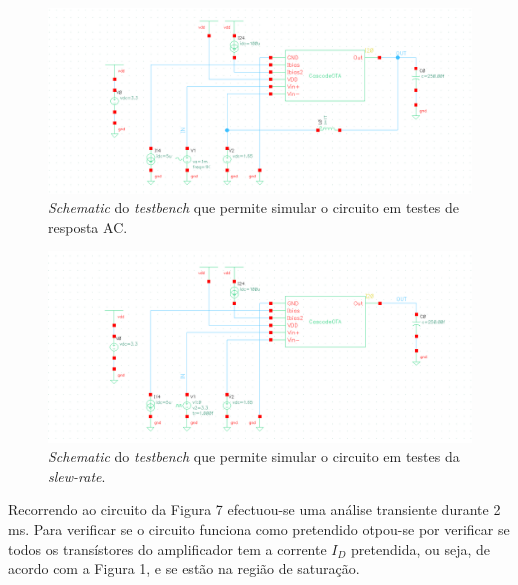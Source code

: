 \documentclass[11pt]{article}
\numberwithin{equation}{section}
\begin{document}
\begin{figure}[H]
	\centering
	\includegraphics[keepaspectratio=true, scale=0.25]{exps/TBac}
	\vspace{-0.5em}
	\caption{\textit{Schematic} do \textit{testbench} que permite simular o circuito em testes de resposta AC.}
	\vspace{-0.8em}
\end{figure} 

\begin{figure}[H]
	\centering
	\includegraphics[keepaspectratio=true, scale=0.25]{exps/TBslewrate}
	\vspace{-0.5em}
	\caption{\textit{Schematic} do \textit{testbench} que permite simular o circuito em testes da \textit{slew-rate}.}
	\vspace{-0.8em}
\end{figure} 

Recorrendo ao circuito da Figura 7 efectuou-se uma análise transiente durante 2 ms. Para verificar se o circuito funciona como pretendido otpou-se por verificar se todos os transístores do amplificador tem a corrente $I_D$ pretendida, ou seja, de acordo com a Figura 1, e se estão na região de saturação.
\end{document}
